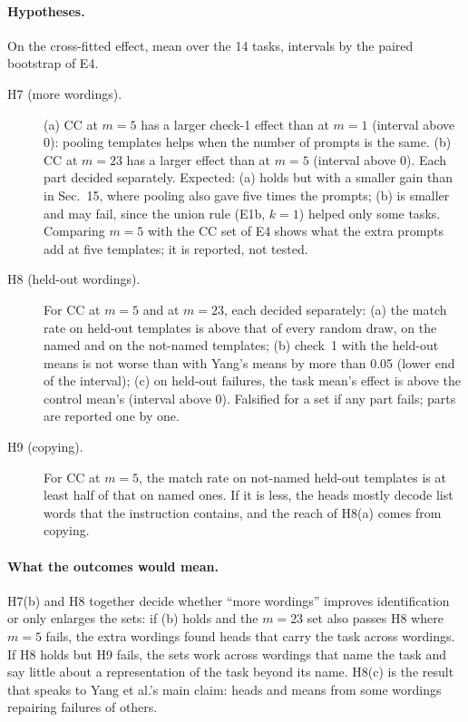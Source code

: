 \paragraph{Hypotheses.} On the cross-fitted effect, mean over the 14 tasks, intervals by the
paired bootstrap of E4.
\begin{description}
  \item[H7 (more wordings).] (a) CC at $m = 5$ has a larger check-1 effect than at $m = 1$
    (interval above 0): pooling templates helps when the number of prompts is the same.
    (b) CC at $m = 23$ has a larger effect than at $m = 5$ (interval above 0). Each part decided
    separately. Expected: (a) holds but with a smaller gain than in Sec.~15, where pooling also
    gave five times the prompts; (b) is smaller and may fail, since the union rule (E1b, $k = 1$)
    helped only some tasks. Comparing $m = 5$ with the CC set of E4 shows what the extra prompts
    add at five templates; it is reported, not tested.
  \item[H8 (held-out wordings).] For CC at $m = 5$ and at $m = 23$, each decided separately:
    (a) the match rate on held-out templates is above that of every random draw, on the named
    and on the not-named templates; (b) check~1 with the held-out means is not worse than with
    Yang's means by more than 0.05 (lower end of the interval); (c) on held-out failures, the
    task mean's effect is above the control mean's (interval above 0). Falsified for a set if
    any part fails; parts are reported one by one.
  \item[H9 (copying).] For CC at $m = 5$, the match rate on not-named held-out templates is
    at least half of that on named ones. If it is less, the heads mostly decode list words
    that the instruction contains, and the reach of H8(a) comes from copying.
\end{description}

\paragraph{What the outcomes would mean.} H7(b) and H8 together decide whether ``more
wordings'' improves identification or only enlarges the sets: if (b) holds and the $m = 23$ set
also passes H8 where $m = 5$ fails, the extra wordings found heads that carry the task across
wordings. If H8 holds but H9 fails, the sets work across wordings that name the task and say
little about a representation of the task beyond its name. H8(c) is the result that speaks to
Yang et al.'s main claim: heads and means from some wordings repairing failures of others.

